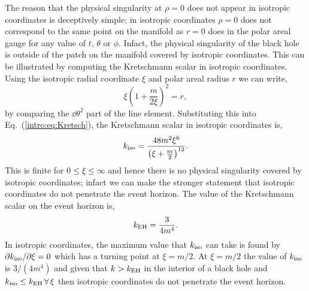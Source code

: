 The reason that the physical singularity at $\rho=0$ does not appear in isotropic coordinates is deceptively simple; in isotropic coordinates $\rho=0$ does not correspond to the same point on the manifold as $r=0$ does in the polar areal gauge for any value of $t$, $\theta$ or $\phi$. Infact, the physical singularity of the black hole is outside of the patch on the manifold covered by isotropic coordinates. This can be illustrated by computing the Kretschmann scalar in isotropic coordinates. Using the isotropic radial coordinate $\xi$ and polar areal radius $r$ we can write,
\begin{equation}
\xi \left(1 +\frac{m}{2\xi} \right)^2 = r,
\end{equation}
by comparing the $\dd\theta^2$ part of the line element. Substituting this into Eq.~(\ref{intro:eq:Kretsch}), the Kretschmann scalar in isotropic coordinates is,
\begin{equation}
k_{\rm iso} =  \frac{48 m^2\xi^6}{\left(\xi + \frac{m}{2} \right)^{12}}.
\end{equation}
This is finite for $0\leq \xi \leq \infty$ and hence there is no physical singularity covered by isotropic coordinates; infact we can make the stronger statement that isotropic coordinates do not penetrate the event horizon. The value of the Kretschmann scalar on the event horizon is,
\begin{equation}
k_{\rm EH} = \frac{3}{4 m^4}.
\end{equation}
In isotropic coordinates, the maximum value that $k_{\rm iso}$ can take is found by $\partial k_{\rm iso} / \partial \xi =0 $ which has a turning point at $\xi = m/2$. At $\xi = m/2$ the value of $k_{\rm iso}$ is $3/(4m^4)$ and given that $k>k_{\rm EH}$ in the interior of a black hole and $k_{\rm iso}\leq k_{\rm EH} \,\forall\, \xi$ then isotropic coordinates do not penetrate the event horizon.    







